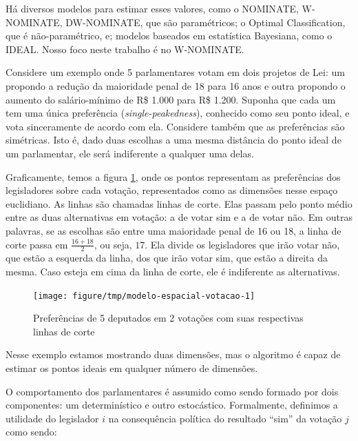 \documentclass[a4paper,titlepage]{ppgi}\usepackage[]{graphicx}\usepackage[]{color}
\newenvironment{knitrout}{}{} %
\begin{document}
Há diversos modelos para estimar esses valores, como o NOMINATE, W-NOMINATE,
DW-NOMINATE, que são paramétricos; o Optimal Classification, que é
não-paramétrico, e; modelos baseados em estatística Bayesiana, como o IDEAL.
Nosso foco neste trabalho é no W-NOMINATE.
\cite{Poole2000,Poole2005,Poole2014,Jackman2000,Clinton2004}

Considere um exemplo onde 5 parlamentares votam em
dois projetos de Lei: um propondo a redução da maioridade penal de
18 para 16 anos e outra
propondo o aumento do salário-mínimo de R\$ 1.000 para
R\$ 1.200. Suponha que cada um tem uma única preferência
(\emph{single-peakedness}), conhecido como seu ponto ideal, e vota sinceramente
de acordo com ela. Considere também que as preferências são simétricas. Isto é,
dado duas escolhas a uma mesma distância do ponto ideal de um parlamentar, ele
será indiferente a qualquer uma delas.

Graficamente, temos a figura \ref{fig:modelo-espacial-votacao}, onde os pontos
representam as preferências dos legisladores sobre cada votação, representados
como as dimensões nesse espaço euclidiano. As linhas são chamadas linhas de
corte. Elas passam pelo ponto médio entre as duas alternativas em votação: a de
votar sim e a de votar não. Em outras palavras, se as escolhas são entre uma
maioridade penal de 16 ou
18, a linha de corte passa em $\frac{16 + 18}{2}$,
ou seja, $17$. Ela divide os legisladores que irão votar não, que estão a
esquerda da linha, dos que irão votar sim, que estão a direita da mesma. Caso
esteja em cima da linha de corte, ele é indiferente as alternativas.

\begin{knitrout}
\color{fgcolor}\begin{figure}
\texttt{[image: figure/tmp/modelo-espacial-votacao-1]} \caption[Preferências de 5 deputados em 2 votações com suas respectivas linhas de corte]{Preferências de 5 deputados em 2 votações com suas respectivas linhas de corte}\label{fig:modelo-espacial-votacao}
\end{figure}


\end{knitrout}

Nesse exemplo estamos mostrando duas dimensões, mas o algoritmo é capaz de
estimar os pontos ideais em qualquer número de dimensões.

O comportamento dos parlamentares é assumido como sendo formado por dois
componentes: um determinístico e outro estocástico. Formalmente, definimos a
utilidade do legislador $i$ na consequência política do resultado ``sim'' da
votação $j$ como sendo:
\end{document}
